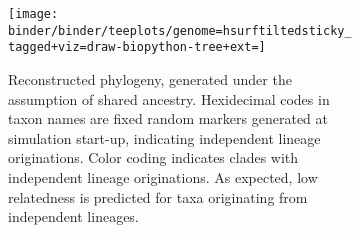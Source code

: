 \begin{figure}[htbp]
    \centering

    \begin{subfigure}[b]{\textwidth}
        \centering
        \texttt{[image: binder/binder/teeplots/genome=hsurftiltedsticky\_tagged+viz=draw-biopython-tree+ext=]}
        \caption{%
          Reconstructed phylogeny, generated under the assumption of shared ancestry.
          Hexidecimal codes in taxon names are fixed random markers generated at simulation start-up, indicating independent lineage originations.
          Color coding indicates clades with independent lineage originations.
          As expected, low relatedness is predicted for taxa originating from independent lineages.
        } \label{fig:validation-example:phylogeny}
    \end{subfigure}

    \vspace{10pt}

    \begin{subfigure}[b]{\textwidth}


\end{subfigure}
\end{figure}
